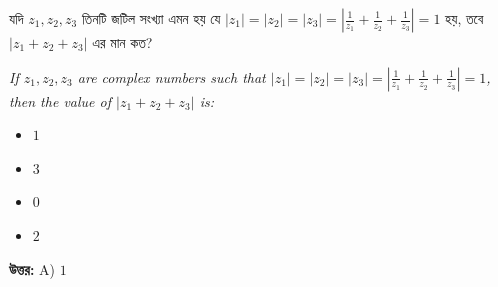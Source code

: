 \documentclass[12pt, a4paper]{article}
\begin{document}
\begin{tcolorbox}[questionbox={প্রশ্ন (Question) 10}]
    \noindent
    যদি $z_1, z_2, z_3$ তিনটি জটিল সংখ্যা এমন হয় যে $|z_1| = |z_2| = |z_3| = \left|\frac{1}{z_1} + \frac{1}{z_2} + \frac{1}{z_3}\right| = 1$ হয়, তবে $|z_1 + z_2 + z_3|$ এর মান কত?
    
    \vspace{0.8em}
    \begin{english}
    \noindent\textit{\color{darkgray}
    If $z_1, z_2, z_3$ are complex numbers such that $|z_1| = |z_2| = |z_3| = \left|\frac{1}{z_1} + \frac{1}{z_2} + \frac{1}{z_3}\right| = 1$, then the value of $|z_1 + z_2 + z_3|$ is:
    }
    \end{english}
\end{tcolorbox}

\begin{itemize}[label={}, leftmargin=1cm, itemsep=0.5em]
    \item[\textbf{A)}] $1$
    \item[\textbf{B)}] $3$
    \item[\textbf{C)}] $0$
    \item[\textbf{D)}] $2$
\end{itemize}

\vspace{0.5em}
\begin{tcolorbox}[answerbox]
    \textbf{\color{success} উত্তর:} A) $1$
\end{tcolorbox}
\vspace{1em}
\end{document}

